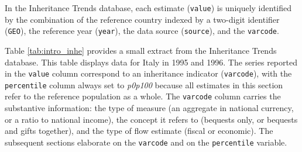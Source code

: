 \documentclass[
]{article}
\begin{document}
In the Inheritance Trends database, each estimate (\texttt{value}) is
uniquely identified by the combination of the reference country indexed
by a two-digit identifier (\texttt{GEO}), the reference year
(\texttt{year}), the data source (\texttt{source}), and the
\texttt{varcode}.

Table \ref{tab:intro_inhe} provides a small extract from the Inheritance
Trends database. This table displays data for Italy in 1995 and 1996.
The series reported in the \texttt{value} column correspond to an
inheritance indicator (\texttt{varcode}), with the \texttt{percentile}
column always set to \emph{p0p100} because all estimates in this section
refer to the reference population as a whole. The \texttt{varcode}
column carries the substantive information: the type of measure (an
aggregate in national currency, or a ratio to national income), the
concept it refers to (bequests only, or bequests and gifts together),
and the type of flow estimate (fiscal or economic). The subsequent
sections elaborate on the \texttt{varcode} and on the
\texttt{percentile} variable.
\end{document}
